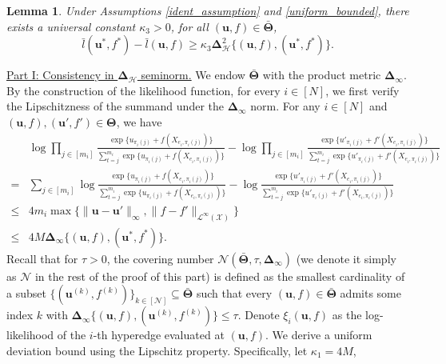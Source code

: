 \documentclass[
  12pt]{article}
\newtheorem{lemma}{Lemma}
\begin{document}
\begin{lemma}\label{lemma_f_quadratic} {Under Assumptions \ref{ident_assumption} and \ref{uniform_bounded}, there exists a universal constant $\kappa_3>0$, for all $(\boldsymbol{u},f) \in \bar{\boldsymbol{\Theta}}$,}
 $$\bar{l}(\boldsymbol{u}^*,f^*)-\bar{l}(\boldsymbol{u},f) \geq \kappa_3 \mathbf{\Delta}^2_{\mathcal{H}}\{(\boldsymbol{u},f), (\boldsymbol{u}^*,f^*)\}.$$
 \end{lemma}
\underline{Part I: Consistency in $\mathbf{\Delta}_{\mathcal{H}}$ seminorm.} We endow $\bar{\boldsymbol{\Theta}}$ with the product metric $\mathbf{\Delta}_\infty$. By the construction of the likelihood function, for every $i\in [N]$, we first verify the Lipschitzness of the summand under the $\mathbf{\Delta}_\infty$ norm. For any $i \in [N]$ and $(\boldsymbol{u},f),(\boldsymbol{u}',f') \in \boldsymbol{\Theta}$, we have
{\small
\begin{align}
&\log\prod_{j \in[m_i]} \frac{\exp \{u_{\pi_i(j)} + f(X_{e_i, \pi_i(j)})\}}{\sum_{t=j}^{m_i} \exp \{u_{\pi_i(j)} + f(X_{e_i, \pi_i(j)})\}}-\log\prod_{j \in[m_i]} \frac{\exp \{u'_{\pi_i(j)} + f'(X_{e_i, \pi_i(j)})\}}{\sum_{t=j}^{m_i} \exp \{u'_{\pi_i(j)} + f'(X_{e_i, \pi_i(j)})\}}\nonumber\\
=&\sum_{j \in[m_i]}\log\frac{\exp \{u_{\pi_i(j)} + f(X_{e_i, \pi_i(j)})\}}{\sum_{t=j}^{m_i} \exp \{u_{\pi_i(j)} + f(X_{e_i, \pi_i(j)})\}}-\log\frac{\exp \{u'_{\pi_i(j)} + f'(X_{e_i, \pi_i(j)})\}}{\sum_{t=j}^{m_i} \exp \{u'_{\pi_i(j)} + f'(X_{e_i, \pi_i(j)})\}}\nonumber\\
\leq&4 m_i \max\{ \| \boldsymbol{u}- \boldsymbol{u}'\|_\infty, \| f-f' \|_{\mathcal{L}^\infty(\mathcal{X})} \}\nonumber\\
\leq &4 M \mathbf{\Delta}_\infty\{(\boldsymbol{u},f),(\boldsymbol{u}^*,f^*)\label{Likelihood_lip}\}.
\end{align}}
 Recall that for $\tau>0$, the covering number $\mathcal{N}(\bar{\boldsymbol{\Theta}}, \tau, \mathbf{\Delta}_\infty)$ (we denote it simply as $\mathcal{N}$ in the rest of the proof of this part) is defined as the smallest cardinality of a subset $\{(\boldsymbol{u}^{(k)}, f^{(k)})\}_{k \in [\mathcal{N}]} \subseteq \bar{\boldsymbol{\Theta}}$ such that every $(\boldsymbol{u}, f) \in \bar{\boldsymbol{\Theta}}$ admits some index $k$ with $\mathbf{\Delta}_\infty\{(\boldsymbol{u}, f),(\boldsymbol{u}^{(k)}, f^{(k)})\} \leq \tau$. Denote $\xi_{i}(\boldsymbol{u},f)$ as the log-likelihood of the $i$-th hyperedge evaluated at $(\boldsymbol{u},f)$. We derive a uniform deviation bound using the Lipschitz property. Specifically, let $\kappa_1= 4M$,
\end{document}
